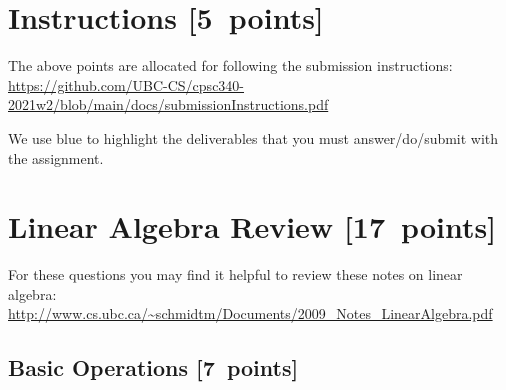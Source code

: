 \documentclass{article}
\newcommand{\blu}[1]{{\textcolor{blu}{#1}}}
\let\ask\blu
\newcommand\pts[1]{\textcolor{pointscolour}{[#1~points]}}
\begin{document}
  \section*{Instructions \pts{5}}

  The above points are allocated for following the submission instructions: \\\url{https://github.com/UBC-CS/cpsc340-2021w2/blob/main/docs/submissionInstructions.pdf}

  \vspace{1em}
  We use \ask{blue} to highlight the deliverables that you must answer/do/submit with the assignment.

  \section{Linear Algebra Review \pts{17}}

  For these questions you may find it helpful to review these notes on linear algebra:\\
  \url{http://www.cs.ubc.ca/~schmidtm/Documents/2009_Notes_LinearAlgebra.pdf}

  \subsection{Basic Operations \pts{7}}
\end{document}
